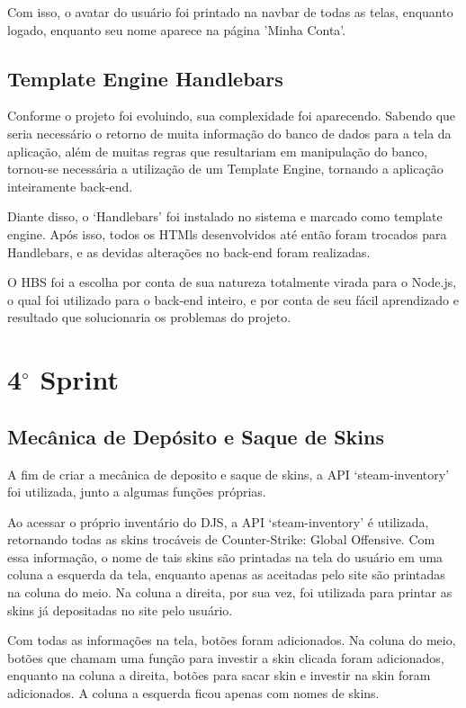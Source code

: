 Com isso, o avatar do usuário foi printado na navbar de todas as telas, enquanto logado, enquanto seu nome 
aparece na página 'Minha Conta'.

\subsection{Template Engine Handlebars}
Conforme o projeto foi evoluindo, sua complexidade foi aparecendo. Sabendo que seria necessário o retorno 
de muita informação do banco de dados para a tela da aplicação, além de muitas regras que resultariam 
em manipulação do banco, tornou-se necessária a utilização de um Template Engine, tornando a aplicação 
inteiramente back-end. 

Diante disso, o ‘Handlebars’ foi instalado no sistema e marcado como template engine. Após isso, todos 
os HTMls desenvolvidos até então foram trocados para Handlebars, e as devidas alterações no back-end 
foram realizadas.

O HBS foi a escolha por conta de sua natureza totalmente virada para o Node.js, o qual foi utilizado 
para o back-end inteiro, e por conta de seu fácil aprendizado e resultado que solucionaria os 
problemas do projeto.

\section{4$^{\circ}$ Sprint}
\subsection{Mecânica de Depósito e Saque de Skins}
A fim de criar a mecânica de deposito e saque de skins, a API ‘steam-inventory’ foi utilizada, 
junto a algumas funções próprias.

Ao acessar o próprio inventário do DJS, a API ‘steam-inventory’ é utilizada, retornando todas as 
skins trocáveis de Counter-Strike: Global Offensive. Com essa informação, o nome de tais skins são 
printadas na tela do usuário em uma coluna a esquerda da tela, enquanto apenas as aceitadas pelo site 
são printadas na coluna do meio. Na coluna a direita, por sua vez, foi utilizada para printar as 
skins já depositadas no site pelo usuário. 

Com todas as informações na tela, botões foram adicionados. Na coluna do meio, botões que chamam 
uma função para investir a skin clicada foram adicionados, enquanto na coluna a direita, botões 
para sacar skin e investir na skin foram adicionados. A coluna a esquerda ficou apenas com nomes 
de skins.

